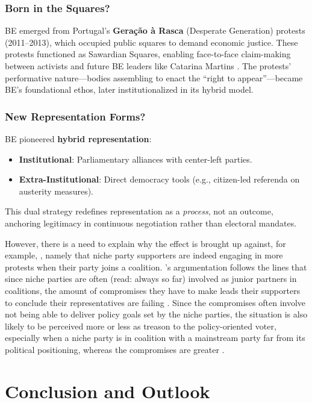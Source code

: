 \begin{greenenv}
	\subsection{Born in the Squares?}
	BE emerged from Portugal’s \textbf{Geração à Rasca} (Desperate Generation) protests (2011–2013), which occupied public squares to demand economic justice. These protests functioned as Sawardian Squares, enabling face-to-face claim-making between activists and future BE leaders like Catarina Martins . The protests’ performative nature—bodies assembling to enact the \enquote{right to appear}—became BE’s foundational ethos, later institutionalized in its hybrid model.

	\subsection{New Representation Forms?}
	BE pioneered \textbf{hybrid representation}:
	\begin{itemize}
		\item \textbf{Institutional}: Parliamentary alliances with center-left parties.
		\item \textbf{Extra-Institutional}: Direct democracy tools (e.g., citizen-led referenda on austerity measures).
	\end{itemize}
	This dual strategy redefines representation as a \textit{process}, not an outcome, anchoring legitimacy in continuous negotiation rather than electoral mandates.

\end{greenenv}

However, there is a need to explain why the effect \cite[see 31]{nonnemacher2023} is brought up against, for example, \cite{torcal2016}, namely that niche party supporters are indeed engaging in more protests when their party joins a coalition. \cite{nonnemacher2023}'s argumentation follows the lines that since niche parties are often (read: always so far) involved as junior partners in coalitions, the amount of compromises they have to make leads their supporters to conclude their representatives are failing \parencite[see 31]{nonnemacher2023}. Since the compromises often involve not being able to deliver policy goals set by the niche parties, the situation is also likely to be perceived more or less as treason to the policy-oriented voter, especially when a niche party is in coalition with a mainstream party far from its political positioning, whereas the compromises are greater \parencite[see 32]{nonnemacher2023}.


%
%
%
\chapter{Conclusion and Outlook} \label{chap:Conclusion and Outlook} %


\printbibliography

